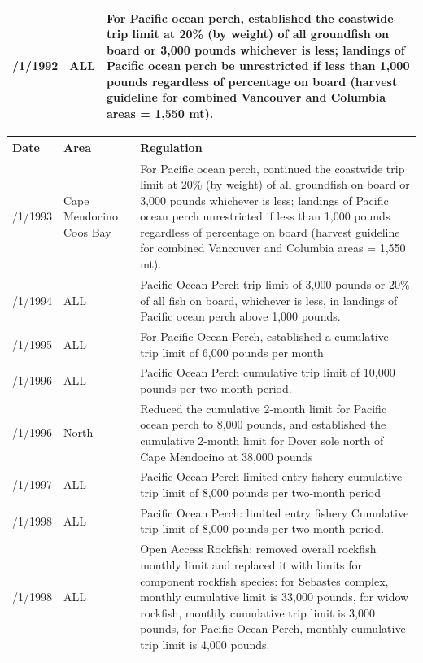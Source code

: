 \documentclass[12pt,]{article}
\begin{document}
\begin{table}[ht]
\begin{tabular}{>{\centering}p{.60in}>{\centering}p{1.0in}>{\raggedright}p{4.20in}}
  1/1/1992 &  ALL  &  For Pacific ocean perch, established the coastwide trip limit at 20\% (by weight) of all groundfish on board or 3,000 pounds whichever is less; landings of Pacific ocean perch be unrestricted if less than 1,000 pounds regardless of percentage on board (harvest guideline for combined Vancouver and Columbia areas = 1,550 mt). \\ 
   \hline
\end{tabular}
\endgroup
\end{table}\begin{table}[ht]
\centering
\begingroup\fontsize{9pt}{10pt}\selectfont
\begin{tabular}{>{\centering}p{.75in}>{\centering}p{.75in}>{\raggedright}p{4.25in}}
  \hline
Date & Area & Regulation \\ 
  \hline
1/1/1993 &  Cape Mendocino Coos Bay  &  For Pacific ocean perch, continued the coastwide trip limit at 20\% (by weight) of all groundfish on board or 3,000 pounds whichever is less; landings of Pacific ocean perch unrestricted if less than 1,000 pounds regardless of percentage on board (harvest guideline for combined Vancouver and Columbia areas = 1,550 mt). \\ 
  1/1/1994 &  ALL  &  Pacific Ocean Perch trip limit of 3,000 pounds or 20\% of all fish on board, whichever is less, in landings of Pacific ocean perch above 1,000 pounds. \\ 
  1/1/1995 &  ALL  &  For Pacific Ocean Perch, established a cumulative trip limit of 6,000 pounds per month \\ 
  1/1/1996 &  ALL  &  Pacific Ocean Perch cumulative trip limit of 10,000 pounds per two-month period. \\ 
  7/1/1996 &  4030 North  &  Reduced the cumulative 2-month limit for Pacific ocean perch to 8,000 pounds, and established the cumulative 2-month limit for Dover sole north of Cape Mendocino at 38,000 pounds \\ 
  1/1/1997 &  ALL  &  Pacific Ocean Perch  limited entry fishery cumulative trip limit of 8,000 pounds per two-month period \\ 
  1/1/1998 &  ALL  &  Pacific Ocean Perch:  limited entry fishery Cumulative trip limit of 8,000 pounds per two-month period. \\ 
  7/1/1998 &  ALL  &  Open Access Rockfish: removed overall rockfish monthly limit and replaced it with limits for component rockfish species: for Sebastes complex, monthly cumulative limit is 33,000 pounds, for widow rockfish, monthly cumulative trip limit is 3,000 pounds, for Pacific Ocean Perch, monthly cumulative trip limit is 4,000 pounds. \\ 

\end{tabular}
\end{table}
\end{document}
